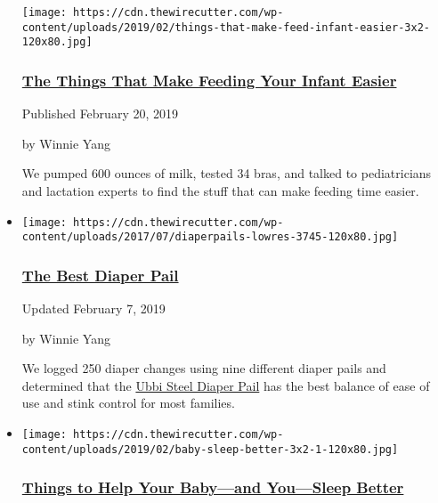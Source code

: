\begin{itemize}
  \texttt{[image: https://cdn.thewirecutter.com/wp-content/uploads/2019/02/things-that-make-feed-infant-easier-3x2-120x80.jpg]}

  \hypertarget{the-things-that-make-feeding-your-infant-easier}{%
  \subsubsection{\texorpdfstring{\href{https://www.nytimes3xbfgragh.onion/wirecutter/lists/make-feeding-your-infant-easier/}{The
  Things That Make Feeding Your Infant
  Easier}}{The Things That Make Feeding Your Infant Easier}}\label{the-things-that-make-feeding-your-infant-easier}}

  Published February 20, 2019

  by Winnie Yang

  We pumped 600 ounces of milk, tested 34 bras, and talked to
  pediatricians and lactation experts to find the stuff that can make
  feeding time easier.
\item
  \href{https://www.nytimes3xbfgragh.onion/wirecutter/reviews/best-diaper-pail/}{}

  \texttt{[image: https://cdn.thewirecutter.com/wp-content/uploads/2017/07/diaperpails-lowres-3745-120x80.jpg]}

  \hypertarget{the-best-diaper-pail}{%
  \subsubsection{\texorpdfstring{\href{https://www.nytimes3xbfgragh.onion/wirecutter/reviews/best-diaper-pail/}{The
  Best Diaper Pail}}{The Best Diaper Pail}}\label{the-best-diaper-pail}}

  Updated February 7, 2019

  by Winnie Yang

  We logged 250 diaper changes using nine different diaper pails and
  determined that the
  \href{https://www.nytimes3xbfgragh.onion/wirecutter/out/link/19792/162131/4/47474/?merchant=Target}{Ubbi
  Steel Diaper Pail} has the best balance of ease of use and stink
  control for most families.
\item
  \href{https://www.nytimes3xbfgragh.onion/wirecutter/lists/things-to-help-your-baby-and-you-sleep-better/}{}

  \texttt{[image: https://cdn.thewirecutter.com/wp-content/uploads/2019/02/baby-sleep-better-3x2-1-120x80.jpg]}

  \hypertarget{things-to-help-your-babyand-yousleep-better}{%
  \subsubsection{\texorpdfstring{\href{https://www.nytimes3xbfgragh.onion/wirecutter/lists/things-to-help-your-baby-and-you-sleep-better/}{Things
  to Help Your Baby---and You---Sleep
  Better}}{Things to Help Your Baby---and You---Sleep Better}}\label{things-to-help-your-babyand-yousleep-better}}


\end{itemize}
